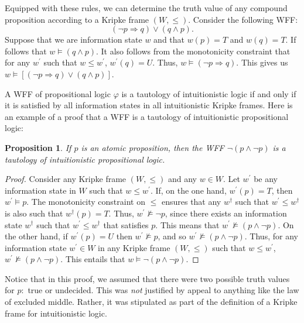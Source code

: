 \documentclass[11pt]{article}
\newtheorem{proposition}[theorem]{Proposition}
\theoremstyle{definition}
\theoremstyle{remark}
\begin{document}
Equipped with these rules, we can determine the truth value of any compound proposition according to a Kripke frame $(W,\leq)$. Consider the following WFF:
$$(\neg p\Rightarrow q)\vee(q\wedge p).$$
Suppose that we are information state $w$ and that $w(p)=T$ and $w(q)=T$. If follows that $w\vDash(q\wedge p)$. It also follows from the monotonicity constraint that for any $w^{\prime}$ such that $w\leq w^{\prime}$, $w^{\prime}(q)=U$. Thus, $w\vDash(\neg p\Rightarrow q)$. This gives us $w\vDash[(\neg p\Rightarrow q)\vee(q\wedge p)]$.\par

A WFF of propositional logic $\varphi$ is a tautology of intuitionistic logic if and only if it is satisfied by all information states in all intuitionistic Kripke frames. Here is an example of a proof that a WFF is a tautology of intuitionistic propositional logic:
\begin{proposition}
    If $p$ is an atomic proposition, then the WFF $\neg(p\wedge\neg p)$ is a tautology of intuitionistic propositional logic.
\end{proposition}
\begin{proof}
    Consider any Kripke frame $(W,\leq)$ and any $w\in W$. Let $w^{\prime}$ be any information state in $W$ such that $w\leq w^{\prime}$. If, on the one hand, $w^{\prime}(p)=T$, then $w^{\prime}\vDash p$. The monotonicity constraint on $\leq$ ensures that any $w^{\dagger}$ such that $w^{\prime}\leq w^{\dagger}$ is also such that $w^{\dagger}(p)=T$. Thus, $w^{\prime}\not\vDash \neg p$, since there exists an information state $w^{\dagger}$ such that $w^{\prime}\leq w^{\dagger}$ that satisfies $p$. This means that $w^{\prime}\not\vDash(p\wedge\neg p)$. On the other hand, if $w^{\prime}(p)=U$ then $w^{\prime}\not\vDash p$, and so $w^{\prime}\not\vDash(p\wedge\neg p)$. Thus, for any information state $w^{\prime}\in W$ in any Kripke frame $(W,\leq)$ such that $w\leq w^{\prime}$, $w^{\prime}\not\vDash(p\wedge\neg p)$. This entails that $w\vDash \neg (p\wedge\neg p)$.
\end{proof}
\noindent
Notice that in this proof, we assumed that there were two possible truth values for $p$:\ true or undecided. This was \textit{not} justified by appeal to anything like the law of excluded middle. Rather, it was stipulated as part of the definition of a Kripke frame for intuitionistic logic.
\end{document}
